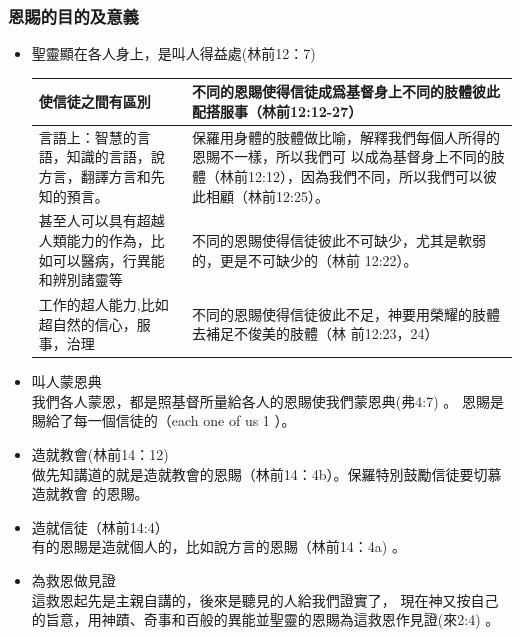 \subsubsection{恩賜的目的及意義}
\begin{itemize}
\item 聖靈顯在各人身上，是叫人得益處(林前12：7) 
\begin{table}[H]
\centering
\begin{tabular}{p{17.5em}p{27.5em}}  \toprule
使信徒之間有區別&不同的恩賜使得信徒成爲基督身上不同的肢體彼此配搭服事（林前12:12-27）\\  \midrule
言語上：智慧的言語，知識的言語，說方言，翻譯方言和先知的預言。&保羅用身體的肢體做比喻，解釋我們每個人所得的恩賜不一樣，所以我們可
以成為基督身上不同的肢體（林前12:12），因為我們不同，所以我們可以彼
此相顧（林前12:25）。\\  \midrule
甚至人可以具有超越人類能力的作為，比如可以醫病，行異能和辨別諸靈等&不同的恩賜使得信徒彼此不可缺少，尤其是軟弱的，更是不可缺少的（林前
12:22）。\\  \midrule
工作的超人能力,比如超自然的信心，服事，治理&不同的恩賜使得信徒彼此不足，神要用榮耀的肢體去補足不俊美的肢體（林
前12:23，24）\\  \midrule
\end{tabular}%
\end{table}

\item 叫人蒙恩典\\ 
我們各人蒙恩，都是照基督所量給各人的恩賜使我們蒙恩典(弗4:7) 。 恩賜是賜給了每一個信徒的（each one of us 1 ）。
\item 造就教會(林前14：12)\\ 
做先知講道的就是造就教會的恩賜（林前14：4b）。保羅特別鼓勵信徒要切慕造就教會
的恩賜。
\item 造就信徒（林前14:4）\\ 
有的恩賜是造就個人的，比如說方言的恩賜（林前14：4a) 。
\item 為救恩做見證\\ 
這救恩起先是主親自講的，後來是聽見的人給我們證實了， 現在神又按自己的旨意，用神蹟、奇事和百般的異能並聖靈的恩賜為這救恩作見證(來2:4) 。
\end{itemize}

